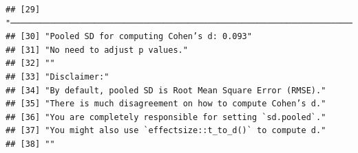 \documentclass[
  man]{apa6}
\begin{document}
\begin{verbatim}
## [29] "────────────────────────────────────────────────────────────────────────────────"  
## [30] "Pooled SD for computing Cohen’s d: 0.093"                                          
## [31] "No need to adjust p values."                                                       
## [32] ""                                                                                  
## [33] "Disclaimer:"                                                                       
## [34] "By default, pooled SD is Root Mean Square Error (RMSE)."                           
## [35] "There is much disagreement on how to compute Cohen’s d."                           
## [36] "You are completely responsible for setting `sd.pooled`."                           
## [37] "You might also use `effectsize::t_to_d()` to compute d."                           
## [38] ""
\end{verbatim}
\end{document}
